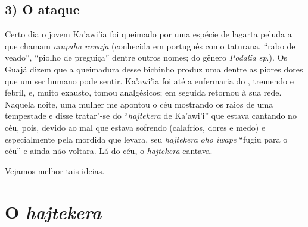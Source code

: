 \subsection{3) O ataque}

\forceindent Certo dia o jovem Ka'awi'ia foi queimado por uma espécie de lagarta
peluda a que chamam \emph{arapaha rawaja} (conhecida em português como
taturana, ``rabo de veado'', ``piolho de preguiça'' dentre outros nomes;
do gênero \emph{Podalia} \emph{sp}.). Os Guajá dizem que a queimadura
desse bichinho produz uma dentre as piores dores que um ser humano pode
sentir. Ka'awi'ia foi até a enfermaria do , tremendo e febril, e,
muito exausto, tomou analgésicos; em seguida retornou à sua rede.
Naquela noite, uma mulher me apontou o céu mostrando os raios de uma
tempestade e disse tratar"-se do ``\emph{hajtekera} de Ka'awi'i'' que
estava cantando no céu, pois, devido ao mal que estava sofrendo
(calafrios, dores e medo) e especialmente pela mordida que levara, seu
\emph{hajtekera} \emph{oho iwape} ``fugiu para o céu'' e ainda não
voltara. Lá do céu, o \emph{hajtekera} cantava.

Vejamos melhor tais ideias.

\section{O \emph{hajtekera}}\label{o-hajtekera}

